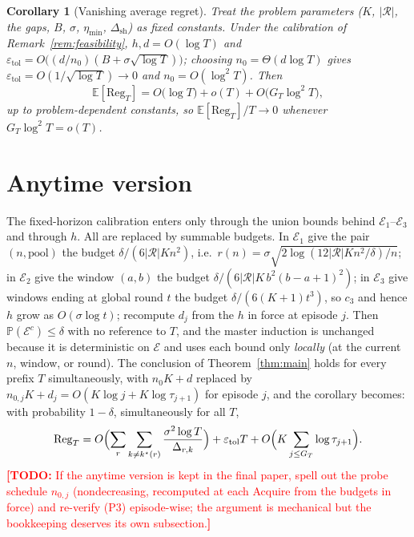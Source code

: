 \documentclass[11pt]{article}
\newtheorem{corollary}{Corollary}
\newcommand{\Ecal}{\mathcal E}
\newcommand{\Rcal}{\mathcal R}
\newcommand{\E}{\mathbb E}
\newcommand{\Pbb}{\mathbb P}
\newcommand{\Reg}{\mathrm{Reg}}
\newcommand{\etol}{\varepsilon_{\mathrm{tol}}}
\newcommand{\dsh}{\Delta_{\mathrm{sh}}}
\newcommand{\todo}[1]{\textcolor{red}{\textbf{[TODO:} #1\textbf{]}}}
\begin{document}
\begin{corollary}[Vanishing average regret]
Treat the problem parameters ($K$, $|\Rcal|$, the gaps, $B$, $\sigma$, $\eta_{\min}$, $\dsh$) as fixed constants. Under the calibration of Remark~\ref{rem:feasibility}, $h,d=O(\log T)$ and $\etol=O\bigl((d/n_0)(B+\sigma\sqrt{\log T})\bigr)$; choosing $n_0=\Theta(d\log T)$ gives $\etol=O(1/\sqrt{\log T})\to0$ and $n_0=O(\log^2T)$. Then
\[
\E[\Reg_T]
=O\bigl(\log T\bigr)
+o(T)
+O\bigl(G_T\log^2 T\bigr),
\]
up to problem-dependent constants, so $\E[\Reg_T]/T\to0$ whenever $G_T\log^2T=o(T)$.
\end{corollary}

\section{Anytime version}
\label{sec:anytime}

The fixed-horizon calibration enters only through the union bounds behind $\Ecal_1$--$\Ecal_3$ and through $h$. All are replaced by summable budgets. In $\Ecal_1$ give the pair $(n,\text{pool})$ the budget $\delta/(6|\Rcal|Kn^2)$, i.e.\ $r(n)=\sigma\sqrt{2\log(12|\Rcal|Kn^2/\delta)/n}$; in $\Ecal_2$ give the window $(a,b)$ the budget $\delta/(6|\Rcal|K\,b^2(b-a+1)^2)$; in $\Ecal_3$ give windows ending at global round $t$ the budget $\delta/(6(K{+}1)t^3)$, so $c_3$ and hence $h$ grow as $O(\sigma\log t)$; recompute $d_j$ from the $h$ in force at episode $j$. Then $\Pbb(\Ecal^c)\le\delta$ with no reference to $T$, and the master induction is unchanged because it is deterministic on $\Ecal$ and uses each bound only \emph{locally} (at the current $n$, window, or round). The conclusion of Theorem~\ref{thm:main} holds for every prefix $T$ simultaneously, with $n_0K+d$ replaced by $n_{0,j}K+d_j=O(K\log j+K\log\tau_{j+1})$ for episode $j$, and the corollary becomes: with probability $1-\delta$, simultaneously for all $T$,
\[
\Reg_T=O\Bigl(\sum_{r}\sum_{k\ne k^\star(r)}\frac{\sigma^2\log T}{\Delta_{r,k}}\Bigr)
+\etol T
+O\Bigl(K\sum_{j\le G_T}\log\tau_{j+1}\Bigr).
\]
\todo{If the anytime version is kept in the final paper, spell out the probe schedule $n_{0,j}$ (nondecreasing, recomputed at each Acquire from the budgets in force) and re-verify (P3) episode-wise; the argument is mechanical but the bookkeeping deserves its own subsection.}

\end{document}
